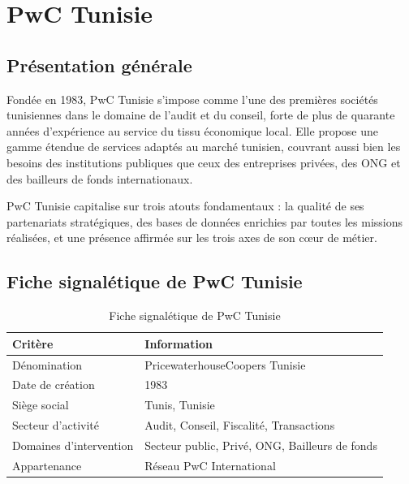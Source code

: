 \documentclass[12pt,a4paper,twoside]{report}
\begin{document}
\section{PwC Tunisie}

\subsection{Présentation générale}

Fondée en 1983, PwC Tunisie s'impose comme l'une des premières sociétés tunisiennes dans le domaine de l'audit et du conseil, forte de plus de quarante années d'expérience au service du tissu économique local. Elle propose une gamme étendue de services adaptés au marché tunisien, couvrant aussi bien les besoins des institutions publiques que ceux des entreprises privées, des ONG et des bailleurs de fonds internationaux.

PwC Tunisie capitalise sur trois atouts fondamentaux : la qualité de ses partenariats stratégiques, des bases de données enrichies par toutes les missions réalisées, et une présence affirmée sur les trois axes de son cœur de métier.

\subsection{Fiche signalétique de PwC Tunisie}

\begin{table}[H]
\centering
\caption{Fiche signalétique de PwC Tunisie}
\label{tab:fiche_pwc_tunisie}
\begin{tabular}{ll}
\toprule
\textbf{Critère}              & \textbf{Information} \\
\midrule
Dénomination                  & PricewaterhouseCoopers Tunisie \\
Date de création              & 1983 \\
Siège social                  & Tunis, Tunisie \\
Secteur d'activité            & Audit, Conseil, Fiscalité, Transactions \\
Domaines d'intervention       & Secteur public, Privé, ONG, Bailleurs de fonds \\
Appartenance                  & Réseau PwC International \\
\bottomrule
\end{tabular}
\end{table}
\end{document}
